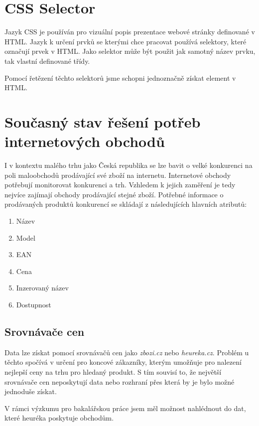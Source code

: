 \documentclass[thesis=B,czech]{FITthesis}[2012/06/26]
\begin{document}
\section{CSS Selector}
Jazyk CSS je používán pro vizuální popis prezentace webové stránky definované v HTML. Jazyk k určení prvků se kterými
chce pracovat používá selektory, které označují prvek v HTML. Jako selektor může být použit jak samotný název prvku,
tak vlastní definované třídy.\cite{CSS}
\par
Pomocí řetězení těchto selektorů jsme schopni jednoznačně získat element v HTML.

\newpage

\section{Současný stav řešení potřeb internetových obchodů}
I v kontextu malého trhu jako Česká republika se lze bavit o velké konkurenci na poli 
maloobchodů prodávající své zboží na internetu.
Internetové obchody potřebují monitorovat konkurenci a trh. Vzhledem k jejich zaměření je tedy nejvíce zajímají 
obchody prodávající stejné zboží. Potřebné informace o prodávaných produktů konkurencí 
se skládají z následujících hlavních atributů:

\begin{enumerate}
\item Název
\item Model
\item EAN
\item Cena
\item Inzerovaný název
\item Dostupnost
\end{enumerate}

\subsection{Srovnávače cen}

Data lze získat pomocí srovnávačů cen jako \textit{zbozi.cz}\cite{heureka} 
nebo \textit{heureka.cz}\cite{zbozi}. Problém u těchto spočívá v určení pro koncové zákazníky, kterým umožňuje
pro nalezení nejlepší ceny na trhu pro hledaný produkt. S tím souvisí to, že největší srovnávače cen neposkytují data nebo
rozhraní přes která by je bylo možné jednoduše získat.
\par
V rámci výzkumu pro bakalářskou práce jsem měl možnost nahlédnout do dat, které heuréka poskytuje obchodům. \cite{hunka}
\end{document}
